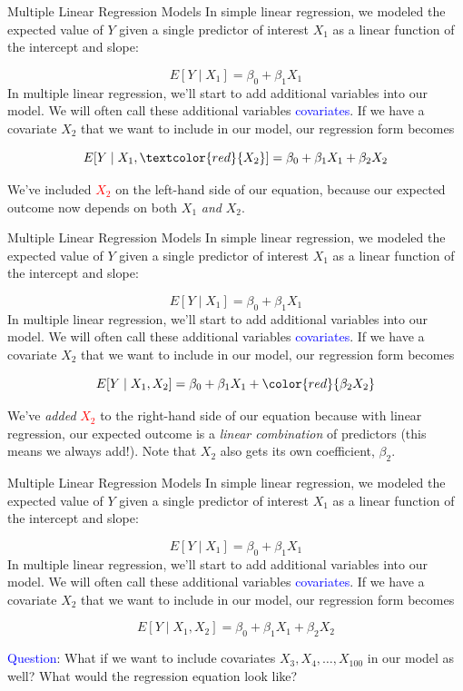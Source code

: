 \documentclass[10pt,t]{beamer}
\begin{document}
\begin{frame}{Multiple Linear Regression Models}
In simple linear regression, we modeled the expected value of $Y$ given a single predictor of interest $X_1$ as a linear function of the intercept and slope:

$$
E[Y \mid X_1] = \beta_0 + \beta_1 X_1
$$
In multiple linear regression, we'll start to add additional variables into our model. We will often call these additional variables \textcolor{blue}{covariates}. If we have a covariate $X_2$ that we want to include in our model, our regression form becomes

$$
E[Y \mid X_1, \textcolor{red}{X_2}] = \beta_0 + \beta_1 X_1 + \beta_2 X_2
$$

We've included \textcolor{red}{$X_2$} on the left-hand side of our equation, because our expected outcome now depends on both $X_1$ \textit{and} $X_2$.

\end{frame}

\begin{frame}{Multiple Linear Regression Models}
In simple linear regression, we modeled the expected value of $Y$ given a single predictor of interest $X_1$ as a linear function of the intercept and slope:

$$
E[Y \mid X_1] = \beta_0 + \beta_1 X_1
$$
In multiple linear regression, we'll start to add additional variables into our model. We will often call these additional variables \textcolor{blue}{covariates}. If we have a covariate $X_2$ that we want to include in our model, our regression form becomes

$$
E[Y \mid X_1, X_2] = \beta_0 + \beta_1 X_1 + \color{red}{\beta_2 X_2}
$$

We've \textit{added} \textcolor{red}{$X_2$} to the right-hand side of our equation because with linear regression, our expected outcome is a \textit{linear combination} of predictors (this means we always add!). Note that $X_2$ also gets its own coefficient, $\beta_2$.

\end{frame}

\begin{frame}{Multiple Linear Regression Models}
In simple linear regression, we modeled the expected value of $Y$ given a single predictor of interest $X_1$ as a linear function of the intercept and slope:

$$
E[Y \mid X_1] = \beta_0 + \beta_1 X_1
$$
In multiple linear regression, we'll start to add additional variables into our model. We will often call these additional variables \textcolor{blue}{covariates}. If we have a covariate $X_2$ that we want to include in our model, our regression form becomes

$$
E[Y \mid X_1, X_2] = \beta_0 + \beta_1 X_1 + \beta_2 X_2
$$

\textcolor{blue}{Question}: What if we want to include covariates $X_3, X_4, \dots, X_{100}$ in our model as well? What would the regression equation look like?
\end{frame}
\end{document}

